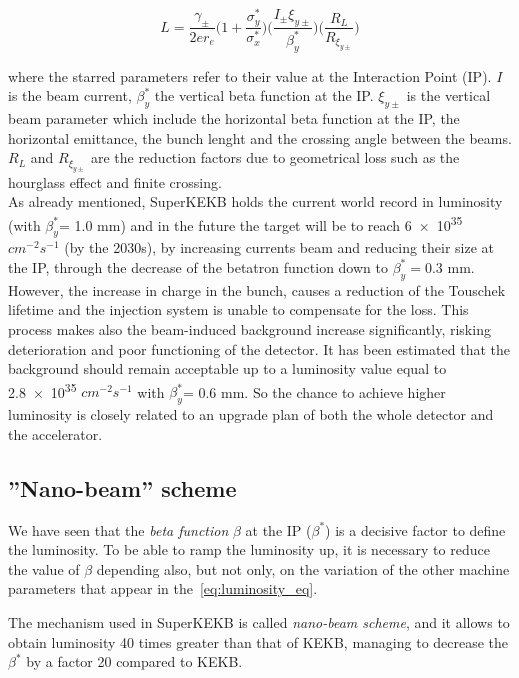 \begin{equation} \label{eq:luminosity_eq}
L = \frac{\gamma_{\pm}}{2er_{e}} \bigg(1 + \frac{\sigma_{y}^{*}}{\sigma_{x}^{*}} \bigg) \bigg(\frac{I_{\pm}\xi_{y\pm}}{\beta^{*}_{y}} \bigg) \bigg(\frac{R_{L}}{R_{\xi_{y\pm}}} \bigg)
\end{equation}

where the starred parameters refer to their value at the Interaction Point (IP).  $I$ is the beam current, $\beta_{y}^{*}$ the vertical beta function at the IP. $\xi_{y\pm}$ is the vertical beam parameter which include the horizontal beta function at the IP, the horizontal emittance, the bunch lenght and the crossing angle between the beams. $R_{L}$ and $R_{\xi_{y\pm}}$ are the reduction factors due to geometrical loss such as the hourglass effect and finite crossing.\\

As already mentioned, SuperKEKB holds the current world record in luminosity (with $\beta^{*}_{y}$= 1.0 mm) and in the future the target will be to reach \num{6e35} $cm^{-2} s^{-1}$ (by the 2030s), by increasing currents beam and reducing their size at the IP, through the decrease of the betatron function down to $\beta^{*}_{y}= 0.3$ mm. 
However, the increase in charge in the bunch, causes a reduction of the Touschek lifetime and the injection system is unable to compensate for the loss.
This process makes also the beam-induced background increase significantly, risking deterioration and poor functioning of the detector.
It has been estimated that the background should remain acceptable up to a luminosity value equal to \num{2.8e35} $cm^{-2} s^{-1}$ with $\beta^{*}_{y}$= 0.6 mm. So the chance to achieve higher luminosity is closely related to an upgrade plan of both the whole detector and the accelerator.


\subsection{''Nano-beam'' scheme} \label{sec:nano_beam}

We have seen that the \textit{beta function} $\beta$ at the IP ($\beta^{*}$) is a decisive factor to define the luminosity. To be able to ramp the luminosity up, it is necessary to reduce the value of $\beta$ depending also, but not only, on the variation of the other machine parameters that appear in the~\autoref{eq:luminosity_eq}.

The mechanism used in SuperKEKB is called \textit{nano-beam scheme}, and it allows to obtain luminosity 40 times greater than that of KEKB, managing to decrease the $\beta^{*}$ by a factor 20 compared to KEKB.\\

